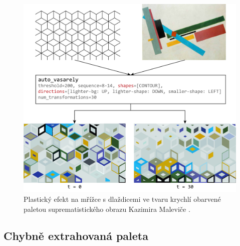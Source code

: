 \begin{figure}[H]
    \centering
    \includegraphics[width=\textwidth]{obrazky-figures/cubes.pdf}
    \caption{Plastický efekt na mřížce s dlaždicemi ve tvaru krychlí obarvené paletou suprematistického obrazu Kazimira Maleviče \cite{suprematism}. }
    \label{fig:cubes}
\end{figure}

\subsection*{Chybně extrahovaná paleta}

